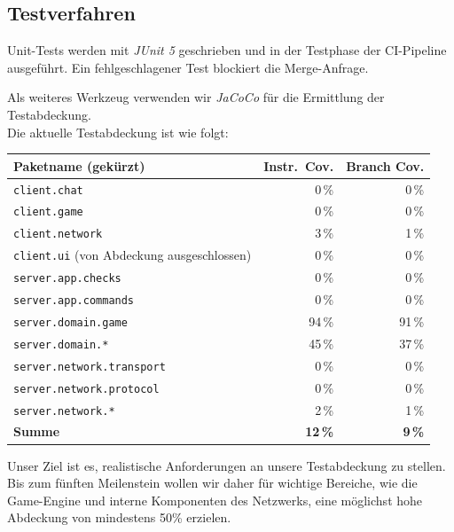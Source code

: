 \documentclass{article}
\begin{document}
\subsection{Testverfahren}
Unit-Tests werden mit \textit{JUnit 5} geschrieben und in der Testphase der CI-Pipeline ausgeführt. Ein fehlgeschlagener Test blockiert die Merge-Anfrage.

Als weiteres Werkzeug verwenden wir \textit{JaCoCo} für die Ermittlung der Testabdeckung. \\
Die aktuelle Testabdeckung ist wie folgt:

\begin{table}[H]
  \centering
  \renewcommand{\arraystretch}{1.4}
  \begin{tabular}{L{7.5cm} r r}
    \toprule
    \textbf{Paketname (gekürzt)}        & \textbf{Instr.\ Cov.} & \textbf{Branch Cov.} \\
    \midrule
    \texttt{client.chat}                                & 0\,\%  & 0\,\% \\
    \texttt{client.game}                                & 0\,\%  & 0\,\% \\
    \texttt{client.network}                             & 3\,\%  & 1\,\% \\
    \texttt{client.ui} (von Abdeckung ausgeschlossen)   & 0\,\%  & 0\,\% \\
    \texttt{server.app.checks}                          & 0\,\%  & 0\,\% \\
    \texttt{server.app.commands}                        & 0\,\%  & 0\,\% \\
    \texttt{server.domain.game}                         & 94\,\%  & 91\,\% \\
    \texttt{server.domain.*}                            & 45\,\%  & 37\,\% \\
    \texttt{server.network.transport}                   & 0\,\%  & 0\,\% \\
    \texttt{server.network.protocol}                    & 0\,\%  & 0\,\% \\
    \texttt{server.network.*}                           & 2\,\%  & 1\,\% \\
    \midrule
    \textbf{Summe}                          & \textbf{12\,\%} & \textbf{9\,\%} \\
    \bottomrule
  \end{tabular}
\end{table}

Unser Ziel ist es, realistische Anforderungen an unsere Testabdeckung zu stellen.
Bis zum fünften Meilenstein wollen wir daher für wichtige Bereiche, wie die Game-Engine und interne Komponenten des Netzwerks, eine möglichst hohe Abdeckung von mindestens 50\% erzielen. 
\end{document}
